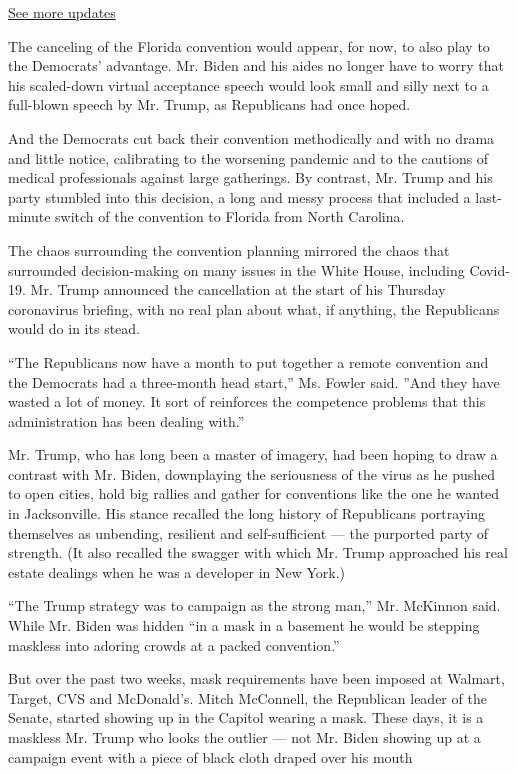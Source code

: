 \href{https://www.nytimes3xbfgragh.onion/2020/07/24/us/elections/2020-presidential-election.html?action=click\&pgtype=Article\&state=default\&module=styln-elections-2020\&region=MAIN_CONTENT_1\&context=storylines_live_updates}{See
more updates}

The canceling of the Florida convention would appear, for now, to also
play to the Democrats' advantage. Mr. Biden and his aides no longer have
to worry that his scaled-down virtual acceptance speech would look small
and silly next to a full-blown speech by Mr. Trump, as Republicans had
once hoped.

And the Democrats cut back their convention methodically and with no
drama and little notice, calibrating to the worsening pandemic and to
the cautions of medical professionals against large gatherings. By
contrast, Mr. Trump and his party stumbled into this decision, a long
and messy process that included a last-minute switch of the convention
to Florida from North Carolina.

The chaos surrounding the convention planning mirrored the chaos that
surrounded decision-making on many issues in the White House, including
Covid-19. Mr. Trump announced the cancellation at the start of his
Thursday coronavirus briefing, with no real plan about what, if
anything, the Republicans would do in its stead.

``The Republicans now have a month to put together a remote convention
and the Democrats had a three-month head start,'' Ms. Fowler said. ''And
they have wasted a lot of money. It sort of reinforces the competence
problems that this administration has been dealing with.''

Mr. Trump, who has long been a master of imagery, had been hoping to
draw a contrast with Mr. Biden, downplaying the seriousness of the virus
as he pushed to open cities, hold big rallies and gather for conventions
like the one he wanted in Jacksonville. His stance recalled the long
history of Republicans portraying themselves as unbending, resilient and
self-sufficient --- the purported party of strength. (It also recalled
the swagger with which Mr. Trump approached his real estate dealings
when he was a developer in New York.)

``The Trump strategy was to campaign as the strong man,'' Mr. McKinnon
said. While Mr. Biden was hidden ``in a mask in a basement he would be
stepping maskless into adoring crowds at a packed convention.''

But over the past two weeks, mask requirements have been imposed at
Walmart, Target, CVS and McDonald's. Mitch McConnell, the Republican
leader of the Senate, started showing up in the Capitol wearing a mask.
These days, it is a maskless Mr. Trump who looks the outlier --- not Mr.
Biden showing up at a campaign event with a piece of black cloth draped
over his mouth

